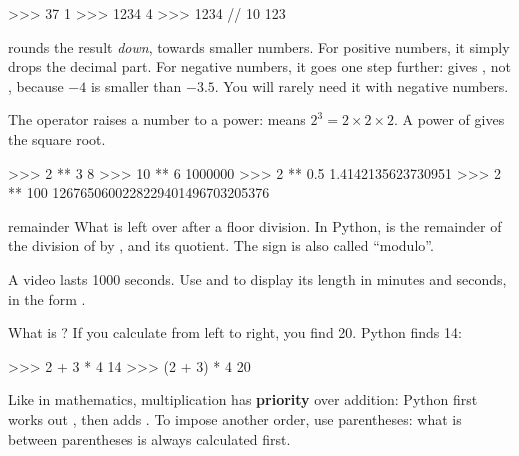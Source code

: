 \begin{console}
>>> 37 %
1
>>> 1234 %
4
>>> 1234 // 10
123
\end{console}

\begin{attention}
\py{//} rounds the result \emph{down}, towards smaller numbers. For positive numbers, it simply drops
the decimal part. For negative numbers, it goes one step further:  gives , not
, because $-4$ is smaller than $-3.5$. You will rarely need it with negative numbers.
\end{attention}

The operator \py{**} raises a number to a power:  means $2^3 = 2 \times 2 \times 2$. A
power of  gives the square root.

\begin{console}
>>> 2 ** 3
8
>>> 10 ** 6
1000000
>>> 2 ** 0.5
1.4142135623730951
>>> 2 ** 100
1267650600228229401496703205376
\end{console}

\begin{definition}{remainder}
What is left over after a floor division. In Python,  is the remainder of the division of
 by , and  its quotient. The sign \py{\%} is also called \enquote{modulo}.
\end{definition}

\begin{atoi}
A video lasts 1000 seconds. Use \py{//} and \py{\%} to display its length in minutes and seconds,
in the form .
\end{atoi}


What is ? If you calculate from left to right, you find 20. Python finds 14:

\begin{console}
>>> 2 + 3 * 4
14
>>> (2 + 3) * 4
20
\end{console}

Like in mathematics, multiplication has \textbf{priority} over addition: Python first works out
, then adds . To impose another order, use parentheses: what is between parentheses
is always calculated first.

